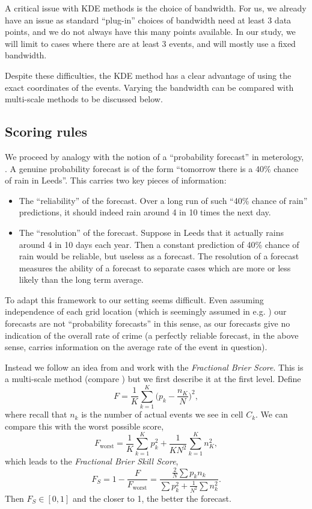 \documentclass[twoside,a4paper,twocolumn,10pt]{article}
\theoremstyle{plain}
\theoremstyle{definition}
\begin{document}
A critical issue with KDE methods is the choice of bandwidth.  For us, we already have
an issue as standard ``plug-in'' choices of bandwidth need at least 3 data points, and
we do not always have this many points available.  In our study, we will limit to cases
where there are at least 3 events, and will mostly use a fixed bandwidth.

Despite these difficulties, the KDE method has a clear advantage of using the
exact coordinates of the events.  Varying the bandwidth can be compared with multi-scale
methods to be discussed below.


\subsection{Scoring rules}

We proceed by analogy with the notion of a ``probability forecast'' in meterology,
\cite[Chapter~7]{js}.  A genuine probability forecast is of the form ``tomorrow there is
a 40\% chance of rain in Leeds''.  This carries two key pieces of information:
\begin{itemize}
\item The ``reliability'' of the forecast.  Over a long run of such ``40\% chance of rain''
predictions, it should indeed rain around 4 in 10 times the next day.
\item The ``resolution'' of the forecast.  Suppose in Leeds that it actually rains around
4 in 10 days each year.  Then a constant prediction of 40\% chance of rain would be reliable,
but useless as a forecast.  The resolution of a forecast measures the ability of a forecast
to separate cases which are more or less likely than the long term average.
\end{itemize}

To adapt this framework to our setting seems difficult.  Even assuming independence
of each grid location (which is seemingly assumed in e.g. \cite[Section~7.3.1]{js}) our
forecasts are not ``probability forecasts'' in this sense, as our forecasts give no indication
of the overall rate of crime (a perfectly reliable forecast, in the above sense, carries
information on the average rate of the event in question).  

Instead we follow an idea from \cite{r} and work with the \emph{Fractional Brier Score}.
This is a multi-scale method (compare \cite{c}) but we first describe it at the first level.
Define
\[ F = \frac{1}{K} \sum_{k=1}^K \Big( p_k - \frac{n_K}{N} \Big)^2, \]
where recall that $n_k$ is the number of actual events we see in cell $C_k$.
We can compare this with the worst possible score,
\[ F_{\text{worst}} = \frac{1}{K} \sum_{k=1}^K p_k^2 + \frac{1}{KN^2} \sum_{k=1}^K n_K^2, \]
which leads to the \emph{Fractional Brier Skill Score},
\[ F_S = 1 - \frac{F}{F_{\text{worst}}}
= \frac{ \frac{2}{N} \sum p_k n_k }{\sum p_k^2 + \frac{1}{N^2} \sum n_k^2}. \]
Then $F_S\in [0,1]$ and the closer to 1, the better the forecast.
\end{document}
